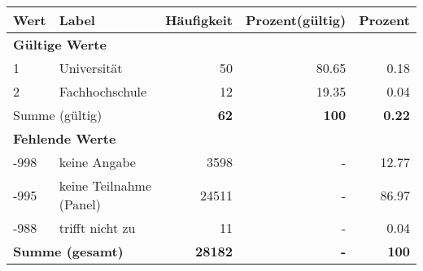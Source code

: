      \begin{longtable}{lXrrr}
     \toprule
     \textbf{Wert} & \textbf{Label} & \textbf{Häufigkeit} & \textbf{Prozent(gültig)} & \textbf{Prozent} \\
     \endhead
     \midrule
     \multicolumn{5}{l}{\textbf{Gültige Werte}}\\

     1 &
     \multicolumn{1}{X}{ Universität   } &


       \num{50} &
       \num[round-mode=places,round-precision=2]{80.65} &
         \num[round-mode=places,round-precision=2]{0.18} \\

     2 &
     \multicolumn{1}{X}{ Fachhochschule   } &


       \num{12} &
       \num[round-mode=places,round-precision=2]{19.35} &
         \num[round-mode=places,round-precision=2]{0.04} \\
     \midrule
     \multicolumn{2}{l}{Summe (gültig)} &
       \textbf{\num{62}} &
     \textbf{\num{100}} &
       \textbf{\num[round-mode=places,round-precision=2]{0.22}} \\
     \multicolumn{5}{l}{\textbf{Fehlende Werte}}\\
       -998 &
       keine Angabe &
         \num{3598} &
        - &
         \num[round-mode=places,round-precision=2]{12.77} \\
       -995 &
       keine Teilnahme (Panel) &
         \num{24511} &
        - &
         \num[round-mode=places,round-precision=2]{86.97} \\
       -988 &
       trifft nicht zu &
         \num{11} &
        - &
         \num[round-mode=places,round-precision=2]{0.04} \\
     \midrule
     \multicolumn{2}{l}{\textbf{Summe (gesamt)}} &
          \textbf{\num{28182}} &
        \textbf{-} &
        \textbf{\num{100}} \\
     \bottomrule
     \end{longtable}
     
